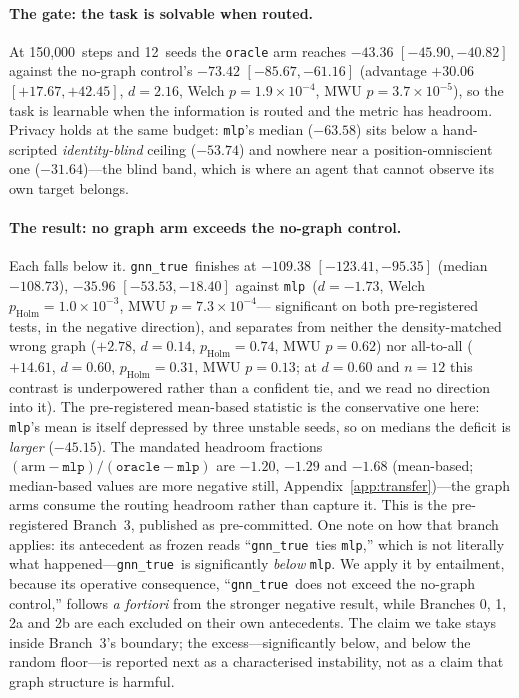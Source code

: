 \documentclass[10pt]{article}
\newcommand{\gtrue}{\texttt{gnn\_true}}
\newcommand{\mlpc}{\texttt{mlp}}
\newcommand{\PDseeds}{12}
\newcommand{\PDsteps}{150{,}000}
\newcommand{\PDblind}{-53.74}          %
\newcommand{\PDinformed}{-31.64}       %
\newcommand{\PDoracle}{-43.36}         %
\newcommand{\PDoracleCI}{[-45.90, -40.82]}
\newcommand{\PDmlp}{-73.42}            %
\newcommand{\PDmlpMed}{-63.58}
\newcommand{\PDmlpCI}{[-85.67, -61.16]}
\newcommand{\PDtrue}{-109.38}          %
\newcommand{\PDtrueMed}{-108.73}
\newcommand{\PDtrueCI}{[-123.41, -95.35]}
\newcommand{\PDoracleGap}{+30.06}      %
\newcommand{\PDoracleGapCI}{[+17.67, +42.45]}
\newcommand{\PDoracleD}{2.16}
\newcommand{\PDtmGap}{-35.96}          %
\newcommand{\PDtmGapCI}{[-53.53, -18.40]}
\newcommand{\PDtmD}{{-}1.73}
\newcommand{\PDtmMedGap}{-45.15}       %
\newcommand{\PDtwGap}{+2.78}           %
\newcommand{\PDtwD}{0.14}
\newcommand{\PDtcGap}{+14.61}          %
\newcommand{\PDtcD}{0.60}
\newcommand{\PDhrTrue}{-1.20}          %
\newcommand{\PDhrWrong}{-1.29}
\newcommand{\PDhrComplete}{-1.68}
\begin{document}
\paragraph{The gate: the task is solvable when routed.} At \PDsteps\ steps and
\PDseeds\ seeds the \texttt{oracle} arm reaches $\PDoracle$ $\PDoracleCI$
against the no-graph control's $\PDmlp$ $\PDmlpCI$ (advantage $\PDoracleGap$
$\PDoracleGapCI$, $d{=}\PDoracleD$, Welch $p{=}1.9{\times}10^{-4}$, MWU
$p{=}3.7{\times}10^{-5}$), so the task is learnable when the information is
routed and the metric has headroom. Privacy holds at the same budget: \mlpc's
median ($\PDmlpMed$) sits below a hand-scripted \emph{identity-blind} ceiling
($\PDblind$) and nowhere near a position-omniscient one ($\PDinformed$)---the
blind band, which is where an agent that cannot observe its own target belongs.

\paragraph{The result: no graph arm exceeds the no-graph control.} Each falls
below it. \gtrue\ finishes at $\PDtrue$ $\PDtrueCI$ (median $\PDtrueMed$),
$\PDtmGap$ $\PDtmGapCI$ against \mlpc\ ($d{=}\PDtmD$, Welch
$p_{\text{Holm}}{=}1.0{\times}10^{-3}$, MWU $p{=}7.3{\times}10^{-4}$---%
significant on both pre-registered tests, in the negative direction), and
separates from neither the density-matched wrong graph ($\PDtwGap$,
$d{=}\PDtwD$, $p_{\text{Holm}}{=}0.74$, MWU $p{=}0.62$) nor all-to-all
($\PDtcGap$, $d{=}\PDtcD$, $p_{\text{Holm}}{=}0.31$, MWU $p{=}0.13$; at
$d{=}\PDtcD$ and $n{=}\PDseeds$ this contrast is underpowered rather than a
confident tie, and we read no direction into it). The pre-registered mean-based
statistic is the conservative one here: \mlpc's mean is itself depressed by
three unstable seeds, so on medians the deficit is \emph{larger}
($\PDtmMedGap$). The mandated headroom fractions
$(\text{arm}-\mlpc)/(\texttt{oracle}-\mlpc)$ are $\PDhrTrue$, $\PDhrWrong$ and
$\PDhrComplete$ (mean-based; median-based values are more negative still,
Appendix~\ref{app:transfer})---the graph arms consume the routing headroom
rather than capture it. This is the pre-registered Branch~3, published as
pre-committed. One note on how that branch applies: its antecedent as frozen
reads ``\gtrue\ ties \mlpc,'' which is not literally what happened---\gtrue\ is
significantly \emph{below} \mlpc. We apply it by entailment, because its
operative consequence, ``\gtrue\ does not exceed the no-graph control,''
follows \emph{a fortiori} from the stronger negative result, while Branches 0,
1, 2a and 2b are each excluded on their own antecedents. The claim we take
stays inside Branch~3's boundary; the excess---significantly below, and below
the random floor---is reported next as a characterised instability, not as a
claim that graph structure is harmful.
\end{document}
